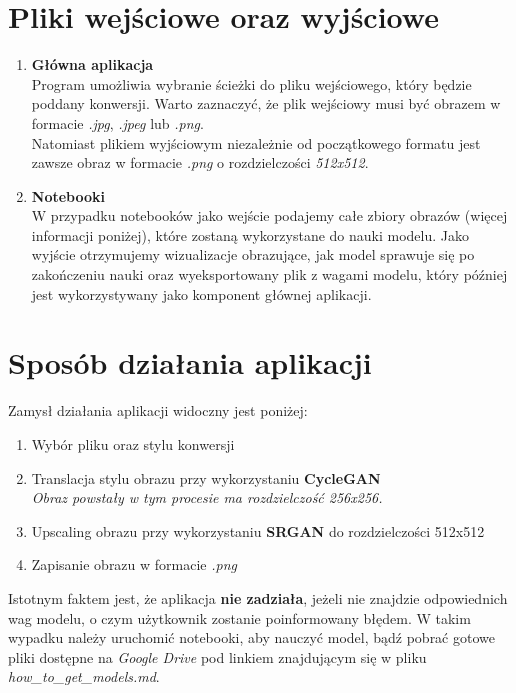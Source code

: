\documentclass{article}
\begin{document}
\section{Pliki wejściowe oraz wyjściowe}
\begin{enumerate}[label=\arabic*.]
    \item \textbf{Główna aplikacja} \\
Program umożliwia wybranie ścieżki do pliku wejściowego, który będzie poddany konwersji. Warto zaznaczyć, że plik wejściowy musi być obrazem w formacie \textit{.jpg}, \textit{.jpeg} lub \textit{.png}.
\vspace{3mm} \\
Natomiast plikiem wyjściowym niezależnie od początkowego formatu jest zawsze obraz w formacie \textit{.png} o rozdzielczości \textit{512x512}.
    \item \textbf{Notebooki} \\
W przypadku notebooków jako wejście podajemy całe zbiory obrazów (więcej informacji poniżej), które zostaną wykorzystane do nauki modelu. Jako wyjście otrzymujemy wizualizacje obrazujące, jak model sprawuje się po zakończeniu nauki oraz wyeksportowany plik z wagami modelu, który później jest wykorzystywany jako komponent głównej aplikacji.
\end{enumerate}

\section{Sposób działania aplikacji}
Zamysł działania aplikacji widoczny jest poniżej:
\begin{enumerate}[label=\arabic*.]
    \item Wybór pliku oraz stylu konwersji
    \item Translacja stylu obrazu przy wykorzystaniu \textbf{CycleGAN} \\
\textit{Obraz powstały w tym procesie ma rozdzielczość 256x256.}
    \item Upscaling obrazu przy wykorzystaniu \textbf{SRGAN} do rozdzielczości 512x512
    \item Zapisanie obrazu w formacie \textit{.png}
\end{enumerate}
Istotnym faktem jest, że aplikacja \textbf{nie zadziała}, jeżeli nie znajdzie odpowiednich wag modelu, o czym użytkownik zostanie poinformowany błędem.
W takim wypadku należy uruchomić notebooki, aby nauczyć model, bądź pobrać gotowe pliki dostępne na \textit{Google Drive} pod linkiem znajdującym się w pliku \textit{how\_to\_get\_models.md}. 
\end{document}
